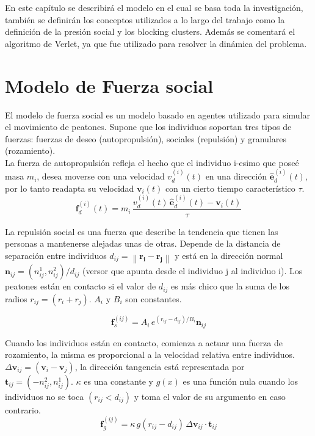 En este capítulo se describirá el modelo en el cual se basa toda la investigación, también se definirán los conceptos utilizados a lo largo del trabajo como la definición de la presión social y los blocking clusters. Además se comentará el algoritmo de Verlet, ya que fue utilizado para resolver la dinámica del problema. 

\section{Modelo de Fuerza social}

El modelo de fuerza social es un modelo basado en agentes utilizado para simular el movimiento de peatones. Supone que los individuos soportan tres tipos de fuerzas: fuerzas de deseo (autopropulsión), sociales (repulsión) y granulares (rozamiento).  \\

La fuerza de autopropulsión refleja el hecho que el individuo i-esimo que poseé masa $m_i$, desea  moverse con una velocidad $v_d^ {(i)}(t)$ en una dirección $\hat{\mathbf{e}}_d^ {(i)}(t)$, por lo tanto readapta su velocidad $\mathbf{v}_i(t)$ con un cierto tiempo característico $\tau$.
\begin{equation}
\mathbf{f}_d^ {(i)}(t)=m_i\,\displaystyle\frac{v_d^ {(i)}(t)\,\hat{\mathbf{e}}_d^ {(i)}(t)-\mathbf{v}_i(t)}{\tau}\label{fdeseo}
\end{equation}

La repulsión social es una fuerza que describe la tendencia que tienen las personas a mantenerse alejadas unas de otras. Depende de la distancia de separación entre individuos $d_{ij}=\left\|\mathbf{r_i}-\mathbf{r_j}\right\|$ y está en la dirección normal $\mathbf{n}_{ij}=(n_{ij}^1,n_{ij}^2)/d_{ij}$ (versor que apunta desde el individuo j al individuo i). Los peatones están en contacto si el valor de $d_{ij}$ es más chico que la suma de los radios $r_{ij}=(r_i+r_j)$. $A_i$ y 	$B_i$ son constantes.

\begin{equation}
\mathbf{f}_s^{(ij)}=A_i\,e^{(r_{ij}-d_{ij})/B_i}\mathbf{n}_{ij}\label{fsocial}
\end{equation} 

Cuando los individuos están en contacto, comienza a actuar una fuerza de rozamiento, la misma es proporcional a la velocidad relativa entre individuos.  
$\Delta \mathbf{v}_{ij}=(\mathbf{v}_i-\mathbf{v}_j)$, la dirección tangencia está representada por $\mathbf{t}_{ij}=(-n_{ij}^2,n_{ij}^1)$.  $\kappa$ es una constante y $g(x)$ es una función nula cuando los individuos no se toca $(r_{ij}<d_{ij})$ y toma el valor de su argumento en caso contrario. 
\begin{equation}
\mathbf{f}_g^{(ij)}=\kappa\,g(r_{ij}-d_{ij})\,\Delta \mathbf{v}_{ij}\cdot\mathbf{t}_{ij}\label{frozamiento}
\end{equation}

